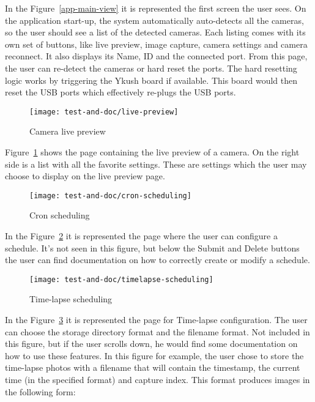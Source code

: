 In the \mbox{Figure \ref{app-main-view}} it is represented the first screen the user sees. On the application start-up, the system automatically auto-detects all the cameras, so the user should see a list of the detected cameras. Each listing comes with its own set of buttons, like live preview, image capture, camera settings and camera reconnect. It also displays its Name, ID and the connected port. From this page, the user can re-detect the cameras or hard reset the ports. The hard resetting logic works by triggering the Ykush board if available. This board would then reset the USB ports which effectively re-plugs the USB ports.

\vspace{0.3cm}
\begin{figure}[!ht]
   \centering
   \texttt{[image: test-and-doc/live-preview]}
   \caption{Camera live preview}\label{live-preview}
\end{figure}


\mbox{Figure \ref{live-preview}} shows the page containing the live preview of a camera. On the right side is a list with all the favorite settings. These are settings which the user may choose to display on the live preview page.

\vspace{0.3cm}
\begin{figure}[!ht]
   \centering
   \texttt{[image: test-and-doc/cron-scheduling]}
   \caption{Cron scheduling}\label{cron-scheduling}
\end{figure}

In the \mbox{Figure \ref{cron-scheduling}} it is represented the page where the user can configure a schedule. It's not seen in this figure, but below the Submit and Delete buttons the user can find documentation on how to correctly create or modify a schedule.

\vspace{0.3cm}
\begin{figure}[!ht]
   \centering
   \texttt{[image: test-and-doc/timelapse-scheduling]}
   \caption{Time-lapse scheduling}\label{timelapse-scheduling}
\end{figure}

In the \mbox{Figure \ref{timelapse-scheduling}} it is represented the page for Time-lapse configuration. The user can choose the storage directory format and the filename format. Not included in this figure, but if the user scrolls down, he would find some documentation on how to use these features. In this figure for example, the user chose to store the time-lapse photos with a filename that will contain the timestamp, the current time (in the specified format) and capture index. This format produces images in the following form:

